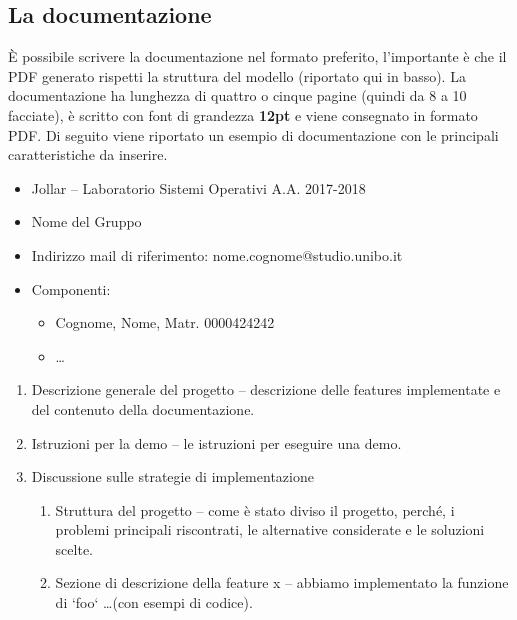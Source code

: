 \subsection{La documentazione}
È possibile scrivere la documentazione nel formato preferito, l'importante è che il PDF generato rispetti la struttura del modello (riportato qui in basso). La documentazione ha lunghezza di quattro o cinque pagine (quindi da 8 a 10 facciate), è scritto con font di grandezza \textbf{12pt} e viene consegnato in formato PDF.
Di seguito viene riportato un esempio di documentazione con le principali caratteristiche da inserire.
\begin{tcolorbox}[colback=green!20!white,colframe=green!75!black,title=L'intestazione della Documentazione]
 \begin{itemize}
  \item Jollar -- Laboratorio Sistemi Operativi A.A. 2017-2018
  \item Nome del Gruppo
  \item Indirizzo mail di riferimento: nome.cognome@studio.unibo.it
  \item Componenti:
        \begin{itemize}
         \item Cognome, Nome, Matr. 0000424242
         \item \dots
        \end{itemize}
 \end{itemize}
\end{tcolorbox}
\begin{tcolorbox}[colback=green!20!white,colframe=green!75!black,title=Il corpo della Documentazione]
 \begin{enumerate}
  \item Descrizione generale del progetto -- descrizione delle features implementate e del contenuto della documentazione.
  \item Istruzioni per la demo -- le istruzioni per eseguire una demo.
  \item Discussione sulle strategie di implementazione
        \begin{enumerate}
         \item Struttura del progetto -- come è stato diviso il progetto, perché, i problemi principali riscontrati, le alternative considerate e le soluzioni scelte.
         \item Sezione di descrizione della feature x -- abbiamo implementato la funzione di `foo` \dots (con esempi di codice).
        \end{enumerate}
 \end{enumerate}
\end{tcolorbox}

